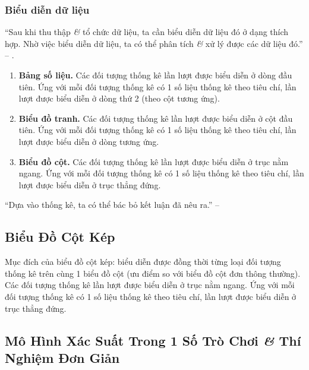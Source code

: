 \documentclass{article}
\numberwithin{equation}{section}
\begin{document}
\subsubsection{Biểu diễn dữ liệu}
``Sau khi thu thập \textit{\&} tổ chức dữ liệu, ta cần biểu diễn dữ liệu đó ở dạng thích hợp. Nhờ việc biểu diễn dữ liệu, ta có thể phân tích \textit{\&} xử lý được các dữ liệu đó.'' -- \cite[p. 6]{SGK_Toan_6_Canh_Dieu_tap_2}.
\begin{enumerate}
	\item \textbf{Bảng số liệu.} Các đối tượng thống kê lần lượt được biểu diễn ở dòng đầu tiên. Ứng với mỗi đối tượng thống kê có 1 số liệu thống kê theo tiêu chí, lần lượt được biểu diễn ở dòng thứ 2 (theo cột tương ứng).
	\item \textbf{Biểu đồ tranh.} Các đối tượng thống kê lần lượt được biểu diễn ở cột đầu tiên. Ứng với mỗi đối tượng thống kê có 1 số liệu thống kê theo tiêu chí, lần lượt được biểu diễn ở dòng tương ứng.
	\item \textbf{Biểu đồ cột.} Các đối tượng thống kê lần lượt được biểu diễn ở trục nằm ngang. Ứng với mỗi đối tượng thống kê có 1 số liệu thống kê theo tiêu chí, lần lượt được biểu diễn ở trục thẳng đứng.
\end{enumerate}
``Dựa vào thống kê, ta có thể bác bỏ kết luận đã nêu ra.'' -- \cite[p. 8]{SGK_Toan_6_Canh_Dieu_tap_2}


\subsection{Biểu Đồ Cột Kép}
Mục đích của biểu đồ cột kép: biểu diễn được đồng thời từng loại đối tượng thống kê trên cùng 1 biểu đồ cột (ưu điểm so với biểu đồ cột đơn thông thường). Các đối tượng thống kê lần lượt được biểu diễn ở trục nằm ngang. Ứng với mỗi đối tượng thống kê có 1 số liệu thống kê theo tiêu chí, lần lượt được biểu diễn ở trục thẳng đứng.


\subsection{Mô Hình Xác Suất Trong 1 Số Trò Chơi \textit{\&} Thí Nghiệm Đơn Giản}
\end{document}
